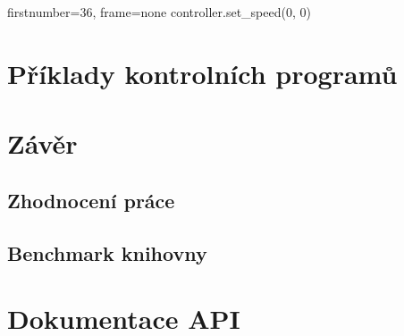 \documentclass[12pt,notitlepage]{report}
\begin{document}
    \begin{pyc*}{firstnumber=36, frame=none}
    controller.set_speed(0, 0)
    \end{pyc*}

\chapter{Příklady kontrolních programů} %

\chapter{Závěr} %

    \section{Zhodnocení práce}

    \section{Benchmark knihovny}

\appendix

\chapter{Dokumentace API}%
\end{document}
